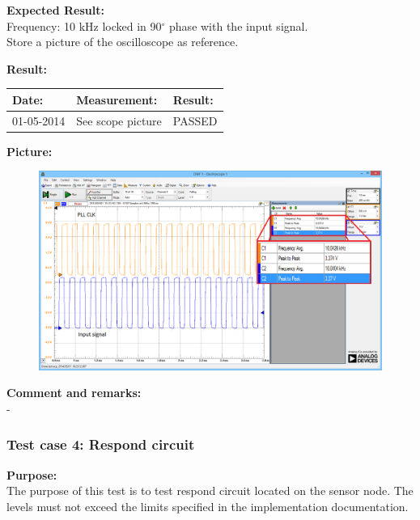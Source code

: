 \textbf{Expected Result:}\\
Frequency: 10 kHz locked in 90$^\circ$ phase with the input signal.\\
Store a picture of the oscilloscope as reference.


\textbf{Result:}
\begin{table}[H]
	\centering
	\begin{tabular}{|p{2cm}|p{3cm}|p{2cm}|}\hline
		\textbf{Date:} & \textbf{Measurement:} & \textbf{Result:} \\ \hline
	 	01-05-2014 & See scope picture & PASSED \\ \hline
	\end{tabular}
\end{table}
\textbf{Picture:}
\begin{figure}[H]
\centering
\includegraphics[width=.9\textwidth]{billeder/SN_Case_3_osc_picture}
\end{figure}
\textbf{Comment and remarks:}\\
-\\

\subsubsection{Test case 4: Respond circuit}
\textbf{Purpose:}\\
The purpose of this test is to test respond circuit located on the sensor node. The levels must not exceed the limits specified in the implementation documentation.\\


